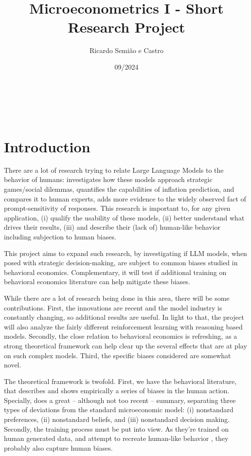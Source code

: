 \documentclass[12pt]{article}
\title{Microeconometrics I - Short Research Project}
\author{Ricardo Semião e Castro}
\date{09/2024}
\makeatletter
\renewcommand{\maketitle}{
  \begin{center}
    {\Huge \@title}\\[2em]
    {\large \@author \hfill \@date}\\[2em]
  \end{center}
}
\makeatother
\begin{document}
\maketitle

\section*{Introduction}

There are a lot of research trying to relate Large Language Models to the behavior of humans: \cite{lore2023} investigates how these models approach strategic games/social dilemmas, \cite{ali2024} quantifies the capabilities of inflation prediction, and compares it to human experts, \cite{tjuatja2024} adds more evidence to the widely observed fact of prompt-sensitivity of responses. This research is important to, for any given application, (i) qualify the usability of these models, (ii) better understand what drives their results, (iii) and describe their (lack of) human-like behavior including subjection to human biases.

This project aims to expand such research, by investigating if LLM models, when posed with strategic decision-making, are subject to common biases studied in behavioral economics. Complementary, it will test if additional training on behavioral economics literature can help mitigate these biases.

While there are a lot of research being done in this area, there will be some contributions. First, the innovations are recent and the model industry is constantly changing, so additional results are useful. In light to that, the project will also analyze the fairly different reinforcement learning with reasoning based models. Secondly, the close relation to behavioral economics is refreshing, as a strong theoretical framework can help clear up the several effects that are at play on such complex models. Third, the specific biases considered are somewhat novel.

The theoretical framework is twofold. First, we have the behavioral literature, that describes and shows empirically a series of biases in the human action. Specially, \cite{della2009} does a great -- although not too recent -- summary, separating three types of deviations from the standard microeconomic model: (i) nonstandard preferences, (ii) nonstandard beliefs, and (iii) nonstandard decision making. Secondly, the training process must be put into view. As they're trained on human generated data, and attempt to recreate human-like behavior \cite{naveed2024}, they probably also capture human biases.
\end{document}
